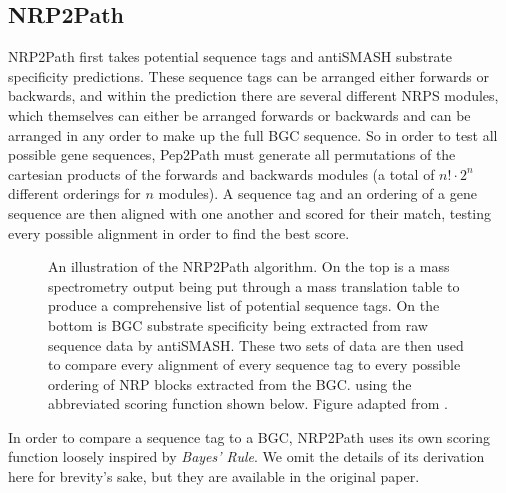 \documentclass{l4proj}
\begin{document}
\subsection{NRP2Path}

NRP2Path first takes potential sequence tags and antiSMASH substrate specificity predictions. These sequence tags can be arranged either forwards or backwards, and within the prediction there are several different NRPS modules, which themselves can either be arranged forwards or backwards and can be arranged in any order to make up the full BGC sequence. So in order to test all possible gene sequences, Pep2Path must generate all permutations of the cartesian products of the forwards and backwards modules (a total of \(n!\cdot2^n\) different orderings for \(n\) modules). A sequence tag and an ordering of a gene sequence are then aligned with one another and scored for their match, testing every possible alignment in order to find the best score.

\begin{figure}
    \centering

    \caption{An illustration of the NRP2Path algorithm. On the top is a mass spectrometry output being put through a mass translation table to produce
    a comprehensive list of potential sequence tags. On the bottom is BGC substrate specificity being extracted from raw sequence data by antiSMASH.
    These two sets of data are then used to compare every alignment of every sequence tag to every possible ordering of NRP blocks extracted from the 
    BGC. using the abbreviated scoring function shown below. Figure adapted from \cite{p2p}.
    }

    \label{fig:nrp2path}
\end{figure}

In order to compare a sequence tag to a BGC, NRP2Path uses its own scoring function loosely inspired by \textit{Bayes' Rule}. We omit the details of its derivation here for brevity's sake, but they are available in the original paper.
\end{document}
